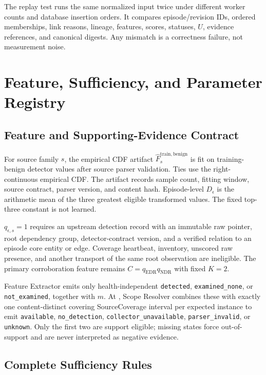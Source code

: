 The replay test runs the same normalized input twice under different worker counts and
database insertion orders. It compares episode/revision IDs, ordered memberships, link
reasons, lineage, features, scores, statuses, $U$, evidence references, and canonical digests.
Any mismatch is a correctness failure, not measurement noise.

\section{Feature, Sufficiency, and Parameter Registry}
\label{app:parameter-registry}

\subsection{Feature and Supporting-Evidence Contract}

For source family $s$, the empirical CDF artifact
$\widehat F^{\mathrm{train,benign}}_s$ is fit on training-benign detector values after source
parser validation. Ties use the right-continuous empirical CDF. The artifact records sample
count, fitting window, source contract, parser version, and content hash. Episode-level
$D_\epsilon$ is the arithmetic mean of the three greatest eligible transformed values. The
fixed top-three constant is not learned.

$q_{\epsilon,s}=1$ requires an upstream detection record with an immutable raw pointer, root
dependency group, detector-contract version, and a verified relation to an episode core entity
or edge. Coverage heartbeat, inventory, unscored raw presence, and another transport of the
same root observation are ineligible. The primary corroboration feature remains
$C=q_{\mathrm{EDR}}q_{\mathrm{NDR}}$ with fixed $K=2$.

Feature Extractor emits only health-independent \texttt{detected},
\texttt{examined\_none}, or \texttt{not\_examined}, together with $m$. At
, Scope Resolver combines these with exactly one
content-distinct covering SourceCoverage interval per expected instance to emit \texttt{available},
\texttt{no\_detection}, \texttt{collector\_unavailable}, \texttt{parser\_invalid}, or
\texttt{unknown}. Only the first two are support eligible; missing states force out-of-support
and are never interpreted as negative evidence.

\subsection{Complete Sufficiency Rules}

